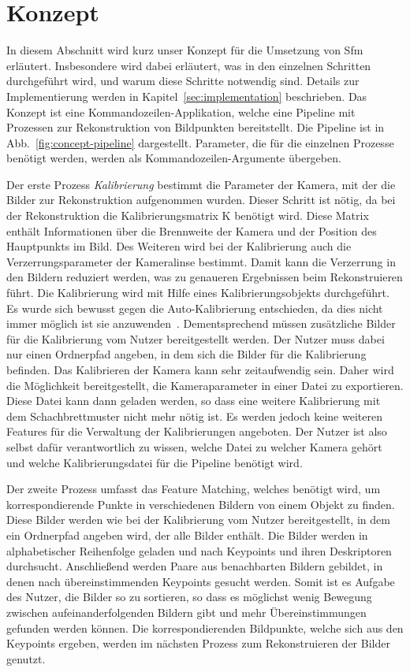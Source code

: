
\chapter{Konzept}
In diesem Abschnitt wird kurz unser Konzept für die Umsetzung von Sfm erläutert. 
Insbesondere wird dabei erläutert, was in den einzelnen Schritten durchgeführt wird, und warum diese Schritte notwendig sind.
Details zur Implementierung werden in Kapitel~\ref{sec:implementation} beschrieben.
Das Konzept ist eine Kommandozeilen-Applikation, welche eine Pipeline mit Prozessen zur Rekonstruktion von Bildpunkten bereitstellt.
Die Pipeline ist in Abb.~\ref{fig:concept-pipeline} dargestellt.
Parameter, die für die einzelnen Prozesse benötigt werden, werden als Kommandozeilen-Argumente übergeben.

Der erste Prozess \emph{Kalibrierung} bestimmt die Parameter der Kamera, mit der die Bilder zur Rekonstruktion aufgenommen wurden.
Dieser Schritt ist nötig, da bei der Rekonstruktion die Kalibrierungsmatrix K benötigt wird.
Diese Matrix enthält Informationen über die Brennweite der Kamera und der Position des Hauptpunkts im Bild.
Des Weiteren wird bei der Kalibrierung auch die Verzerrungsparameter der Kameralinse bestimmt.
Damit kann die Verzerrung in den Bildern reduziert werden, was zu genaueren Ergebnissen beim Rekonstruieren führt.
Die Kalibrierung wird mit Hilfe eines Kalibrierungsobjekts durchgeführt.
Es wurde sich bewusst gegen die Auto-Kalibrierung entschieden, da dies nicht immer möglich ist sie anzuwenden~\cite{remondino_2005}.
Dementsprechend müssen zusätzliche Bilder für die Kalibrierung vom Nutzer bereitgestellt werden.
Der Nutzer muss dabei nur einen Ordnerpfad angeben, in dem sich die Bilder für die Kalibrierung befinden.
Das Kalibrieren der Kamera kann sehr zeitaufwendig sein.
Daher wird die Möglichkeit bereitgestellt, die Kameraparameter in einer Datei zu exportieren.
Diese Datei kann dann geladen werden, so dass eine weitere Kalibrierung mit dem Schachbrettmuster nicht mehr nötig ist. 
Es werden jedoch keine weiteren Features für die Verwaltung der Kalibrierungen angeboten.
Der Nutzer ist also selbst dafür verantwortlich zu wissen, welche Datei zu welcher Kamera gehört und welche Kalibrierungsdatei für die Pipeline benötigt wird. 

Der zweite Prozess umfasst das Feature Matching, welches benötigt wird, um korrespondierende Punkte in verschiedenen Bildern von einem Objekt zu finden.
Diese Bilder werden wie bei der Kalibrierung vom Nutzer bereitgestellt, in dem ein Ordnerpfad angeben wird, der alle Bilder enthält. 
Die Bilder werden in alphabetischer Reihenfolge geladen und nach Keypoints und ihren Deskriptoren durchsucht.
Anschließend werden Paare aus benachbarten Bildern gebildet, in denen nach übereinstimmenden Keypoints gesucht werden.
Somit ist es Aufgabe des Nutzer, die Bilder so zu sortieren, so dass es möglichst wenig Bewegung zwischen aufeinanderfolgenden Bildern gibt und mehr Übereinstimmungen gefunden werden können.
Die korrespondierenden Bildpunkte, welche sich aus den Keypoints ergeben, werden im nächsten Prozess zum Rekonstruieren der Bilder genutzt.  

